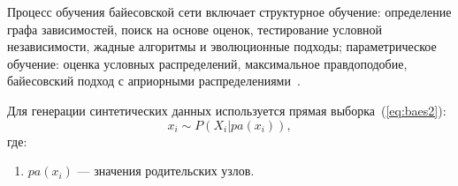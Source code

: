Процесс обучения байесовской сети включает структурное обучение: определение графа зависимостей, поиск на основе оценок, тестирование условной независимости, жадные алгоритмы и эволюционные подходы; параметрическое обучение: оценка условных распределений, максимальное правдоподобие, байесовский подход с априорными распределениями~\cite{bs}.

Для генерации синтетических данных используется прямая выборка~(\ref{eq:baes2}):
\begin{equation}\label{eq:baes2}
    x_i \sim P(X_i | pa(x_i)),
\end{equation}
где:
\begin{enumerate}[label*=---]
	\item $pa(x_i)$ --- значения родительских узлов.
\end{enumerate}










